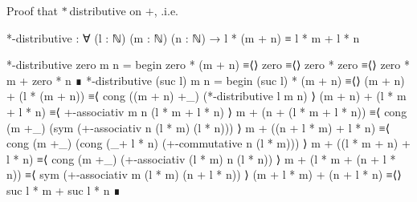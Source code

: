 \begin{exercise}
Proof that $*$ distributive on $+$, .i.e.

\begin{code}
*-distributive : ∀ (l : ℕ) (m : ℕ) (n : ℕ)
  → l * (m + n) ≡ l * m + l * n
\end{code}
\end{exercise}

\begin{code}
*-distributive zero m n =
  begin
    zero * (m + n)
  ≡⟨⟩
    zero
  ≡⟨⟩
    zero * zero
  ≡⟨⟩
    zero * m + zero * n
  ∎
*-distributive (suc l) m n =
  begin
    (suc l) * (m + n)
  ≡⟨⟩
    (m + n) + (l * (m + n))
  ≡⟨ cong ((m + n) +_) (*-distributive l m n) ⟩
    (m + n) + (l * m + l * n)
  ≡⟨ +-associativ m n (l * m + l * n) ⟩
    m + (n + (l * m + l * n))
  ≡⟨ cong (m +_) (sym (+-associativ n (l * m) (l * n))) ⟩
    m + ((n + l * m) + l * n)
  ≡⟨ cong (m +_) (cong (_+ l * n) (+-commutative n (l * m))) ⟩
    m + ((l * m + n) + l * n)
  ≡⟨ cong (m +_) (+-associativ (l * m) n (l * n)) ⟩
    m + (l * m + (n + l * n))
  ≡⟨ sym (+-associativ  m (l * m) (n + l * n)) ⟩
    (m + l * m) + (n + l * n)
  ≡⟨⟩
    suc l * m + suc l * n
  ∎
\end{code}
